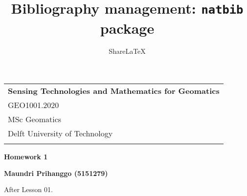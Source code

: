 \documentclass[a4paper,12pt]{article} %
\title{Bibliography management: \texttt{natbib} package}
\author{Share\LaTeX}
\date { }
\begin{document}



\thispagestyle{empty} %

\begin{tabular}{p{15.5cm}} %
{\large \bf Sensing Technologies and Mathematics for Geomatics} \\
GEO1001.2020 \\ MSc Geomatics \\ Delft University of Technology \\
\hline %
\\
\end{tabular} %

\vspace*{0.3cm} %

\begin{center} %
	{\Large \bf Homework 1} %
	\vspace{2mm}
	
	{\bf Maundri Prihanggo (5151279)} %
		
\end{center}  

\vspace{0.4cm}



\begin{flushleft}
\Large{After Lesson 01.}
\end{flushleft}
\end{document}

